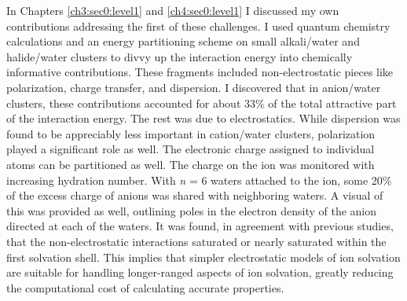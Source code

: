 \begin{conclude}
  In Chapters \ref{ch3:sec0:level1} and \ref{ch4:sec0:level1} I discussed my own contributions addressing the first of these challenges. I used quantum
  chemistry calculations and an energy partitioning scheme on small alkali/water and halide/water clusters to divvy up the interaction energy into chemically
  informative contributions. These fragments included non-electrostatic pieces like polarization, charge transfer, and dispersion. I discovered that in anion/water
  clusters, these contributions accounted for about 33\% of the total attractive part of the interaction energy. The rest was due to electrostatics. While
  dispersion was found to be appreciably less important in cation/water clusters, polarization played a significant role as well. The electronic charge 
  assigned to individual atoms can be partitioned as well. The charge on the ion was monitored with increasing hydration number. With \emph{n} = 6 waters
  attached to the ion, some 20\% of the excess charge of anions was shared with neighboring waters. A visual of this was provided as well, outlining poles
  in the electron density of the anion directed at each of the waters. It was found, in agreement with previous studies, that the non-electrostatic 
  interactions saturated or nearly saturated within the first solvation shell. This implies that simpler electrostatic models of ion solvation are suitable
  for handling longer-ranged aspects of ion solvation, greatly reducing the computational cost of calculating accurate properties.
  

\end{conclude}

